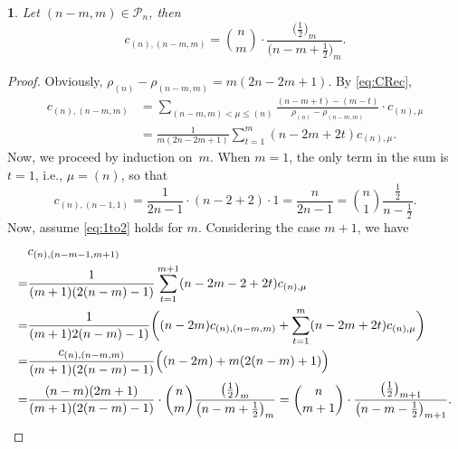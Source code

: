 \documentclass{mathincs}
\numberwithin{equation}{section}
\numberwithin{figure}{section}
\theoremstyle{plain}
\newtheorem{thm}{\protect\theoremname}[section]
\theoremstyle{definition}
\theoremstyle{remark}
\theoremstyle{plain}
\theoremstyle{definition}
\theoremstyle{plain}
\theoremstyle{plain}
\providecommand{\theoremname}{Theorem}
\begin{document}
\begin{thm}\label{thm:row1}
Let $(n-m,m)\in\mathcal{P}_n$, then
\begin{equation}\label{eq:1to2}
  c_{(n),(n-m,m)} =
  \binom{n}{m}\cdot\frac{\bigl(\frac12\bigr)_m}{\bigl(n-m+\frac12\bigr)_m}.
\end{equation}
\end{thm}
\begin{proof}
Obviously, 
$ \rho_{(n)}-\rho_{(n-m,m)}=m(2n-2m+1)$. By \eqref{eq:CRec},
\begin{align*}
  c_{(n),(n-m,m)}
  &= \sum_{(n-m,m)<\mu\leq(n)}\frac{(n-m+t)-(m-t)}
    {\rho_{(n)}-\rho_{(n-m,m)}}\cdot c_{(n),\mu} \\
  &= \frac{1}{m(2n-2m+1)}\sum_{t=1}^{m}(n-2m+2t)c_{(n),\mu}.
\end{align*}
Now, we proceed by induction on~$m$. When $m=1$, the only term in the sum is $t=1$, i.e., $\mu=(n)$,  so that
\begin{equation}\label{eq:cnton1}
  c_{(n),(n-1,1)}=\frac{1}{2n-1}\cdot(n-2+2)\cdot1=\frac{n}{2n-1}=\binom{n}{1}\frac{\frac{1}{2}}{n-\frac{1}{2}}.
\end{equation}
Now, assume \eqref{eq:1to2} holds for $m$. Considering the case $m+1$, we have
\begin{align*}
 & c_{(n),(n-m-1,m+1)}  \\
 =& \frac{1}{(m+1)(2(n-m)-1)}\sum_{t=1}^{m+1}(n-2m-2+2t)c_{(n),\mu}\\
= & \frac{1}{(m+1)2(n-m)-1)}\biggl((n-2m)c_{(n),(n-m,m)}+\sum_{t=1}^{m}(n-2m+2t)c_{(n),\mu}\biggr)\\
=& \frac{c_{(n),(n-m,m)}}{(m+1)(2(n-m)-1)}\Bigl((n-2m)+m(2(n-m)+1)\Bigr) \\
=& \frac{(n-m)(2m+1)}{(m+1)(2(n-m)-1)}\cdot\binom{n}{m}\frac{\bigl(\frac12\bigr)_m}{\bigl(n-m+\frac12\bigr)_m}
 = \binom{n}{m+1}\cdot\frac{\bigl(\frac12\bigr)_{m+1}}{\bigl(n-m-\frac12\bigr)_{m+1}}.  \qedhere
\end{align*}

\end{proof}
\end{document}
